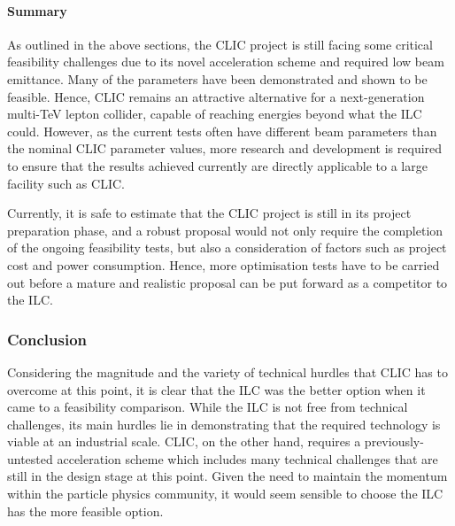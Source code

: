 \paragraph{Summary}

As outlined in the above sections, the CLIC project is still facing some critical feasibility challenges due to its novel acceleration scheme and required low beam emittance. Many of the parameters have been demonstrated and shown to be feasible. Hence, CLIC remains an attractive alternative for a next-generation multi-TeV lepton collider, capable of reaching energies beyond what the ILC could. However, as the current tests often have different beam parameters than the nominal CLIC parameter values, more research and development is required to ensure that the results achieved currently are directly applicable to a large facility such as CLIC.

Currently, it is safe to estimate that the CLIC project is still in its project preparation phase, and a robust proposal would not only require the completion of the ongoing feasibility tests, but also a consideration of factors such as project cost and power consumption. Hence, more optimisation tests have to be carried out before a mature and realistic proposal can be put forward as a competitor to the ILC. \cite{CLIC:Concept}

\subsubsection{Conclusion}
Considering the magnitude and the variety of technical hurdles that CLIC has to overcome at this 
point, it is clear that the ILC was the better option when it came to a feasibility comparison. While 
the ILC is not free from technical challenges, its main hurdles lie in demonstrating that the required 
technology is viable at an industrial scale. CLIC, on the other hand, requires a previously-untested 
acceleration scheme which includes many technical challenges that are still in the design stage at 
this point. Given the need to maintain the momentum within the particle physics community, it 
would seem sensible to choose the ILC has the more feasible option. 